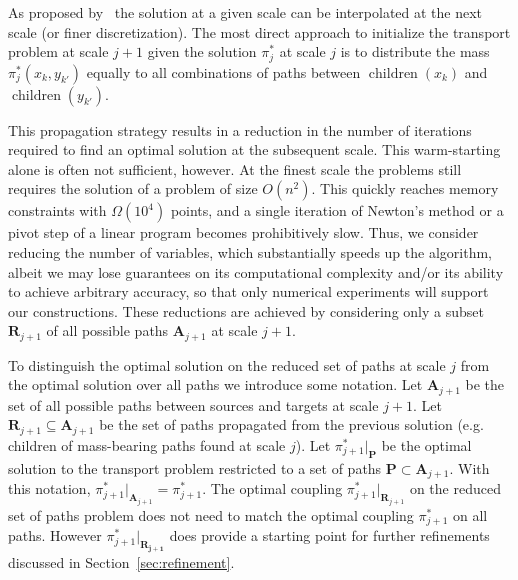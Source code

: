 \documentclass[twoside,11pt]{article}
\newcommand{\children}[0]{\operatorname{children}}
\newcommand{\coupling}[0]{\pi}
\begin{document}
As proposed by~\citet{glimm:arxiv2011} the solution at a given scale can be
interpolated at the next scale (or finer discretization).  The most direct
approach to initialize the transport problem at scale $j+1$ given the solution
$\coupling_{j}^*$ at scale $j$ is to distribute the mass $\coupling_{j}^*(x_k,
y_{k'})$ equally to all combinations of paths between $\children(x_k)$ and
$\children(y_{k'})$.  

This propagation strategy results in a reduction in the number of iterations
required to find an optimal solution at the subsequent scale.  This
warm-starting alone is often not sufficient, however. At the finest scale the
problems still requires the solution of a problem of size $O(n^2)$. This
quickly reaches memory constraints with $\Omega(10^4)$ points, and a single
iteration of Newton's method or a pivot step of a linear program becomes
prohibitively slow. Thus, we consider reducing the number of variables, which
substantially speeds up the algorithm, albeit we may lose guarantees on its
computational complexity and/or its ability to achieve arbitrary accuracy, so
that only numerical experiments will support our constructions.  These
reductions are achieved by considering only a subset $\mathbf{R}_{j+1}$ of all
possible paths $\mathbf{A}_{j+1}$ at scale $j+1$.

To distinguish the optimal solution on the reduced set of paths at scale $j$
from the optimal solution over all paths we introduce some notation. Let
$\mathbf{A}_{j+1}$ be the set of all possible paths between sources and targets
at scale $j+1$. Let $\mathbf{R}_{j+1} \subseteq \mathbf{A}_{j+1}$ be the set of
paths propagated from the previous solution (e.g. children of mass-bearing
paths found at scale $j$).  Let $\coupling^*_{j+1}  |_{\mathbf{P}}$ be the
optimal solution to the transport problem restricted to a set of paths
$\mathbf{P} \subset \mathbf{A}_{j+1}$.  With this notation, $ \coupling_{j+1}^*
|_{\mathbf{A}_{j+1}} = \coupling_{j+1}^*$.  The optimal coupling
$\coupling_{j+1}^*|_{\mathbf{R}_{j+1}}$ on the reduced set of paths problem does
not need to match the optimal coupling $\coupling_{j+1}^*$ on all paths.
However $ \coupling_{j+1}^* |_\mathbf{R_{j+1}}$ does provide a starting point
for further refinements discussed in Section~\ref{sec:refinement}.
\end{document}

